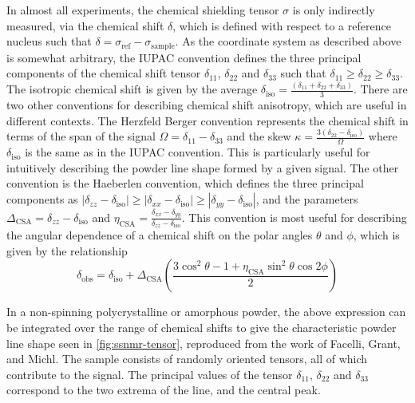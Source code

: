 \begin{refsection}
In almost all experiments, the chemical shielding tensor $ \sigma $ is only indirectly measured, via the chemical shift $ \delta $, which is defined with respect to a reference nucleus such that $ \delta = \sigma_{\textrm{ref}} - \sigma_{\textrm{sample}} $.
As the coordinate system as described above is somewhat arbitrary, the IUPAC convention defines the three principal components of the chemical shift tensor $ \delta_{11} $, $ \delta_{22} $ and $ \delta_{33} $ such that $ \delta_{11} \geq \delta_{22} \geq \delta_{33} $.
The isotropic chemical shift is given by the average $ \delta_{\textrm{iso}} = \frac{(\delta_{11} + \delta_{22} + \delta_{33})}{3} $.
There are two other conventions for describing chemical shift anisotropy, which are useful in different contexts.
The Herzfeld Berger convention represents the chemical shift in terms of the span of the signal $ \Omega = \delta_{11} - \delta_{33} $ and the skew $ \kappa = \frac{3(\delta_{22} - \delta_{\textrm{iso}})}{\Omega} $ where $ \delta_{\textrm{iso}} $ is the same as in the IUPAC convention.
This is particularly useful for intuitively describing the powder line shape formed by a given signal.
The other convention is the Haeberlen convention, which defines the three principal components as $ |\delta_{zz} - \delta_{\textrm{iso}}| \geq |\delta_{xx} - \delta_{\textrm{iso}}| \geq |\delta_{yy} - \delta_{\textrm{iso}}| $, and the parameters $ \Delta_{\textrm{CSA}} = \delta_{zz} -\delta_{\textrm{iso}} $ and $ \eta_{\textrm{CSA}} = \frac{\delta_{xx} - \delta_{yy}}{\delta_{zz} -\delta_{\textrm{iso}}} $.
This convention is most useful for describing the angular dependence of a chemical shift on the polar angles $ \theta $ and $ \phi $, which is given by the relationship\autocite{Haeberlen1976}
\begin{equation}
  \delta_{\textrm{obs}} = \delta_{\textrm{iso}} + \Delta_{\textrm{CSA}} \left(\frac{3 \cos^2 \theta - 1 + \eta_{\textrm{CSA}} \sin^2 \theta \cos 2 \phi}{2} \right)
  \label{eqn:orientation-csa}
\end{equation}

In a non-spinning polycrystalline or amorphous powder, the above expression can be integrated over the range of chemical shifts to give the characteristic powder line shape seen in \cref{fig:ssnmr-tensor}, reproduced from the work of Facelli, Grant, and Michl.\autocite{Facelli1987Carbon-13Determination}
The sample consists of randomly oriented tensors, all of which contribute to the signal.
The principal values of the tensor $ \delta_{11} $, $ \delta_{22} $ and $ \delta_{33} $ correspond to the two extrema of the line, and the central peak.


\end{refsection}
